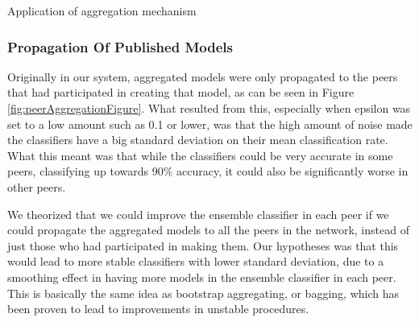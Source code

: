 \begin{algorithm}[!h]
\caption{Application of aggregation mechanism}
\end{algorithm}




\subsubsection{Propagation Of Published Models} \label{sec:PropagationPubModel}

Originally in our system, aggregated models were only propagated to the peers that had participated in creating that model, as can be seen in Figure \ref{fig:peerAggregationFigure}. What resulted from this, especially when epsilon was set to a low amount such as 0.1 or lower, was that the high amount of noise made the classifiers have a big standard deviation on their mean classification rate. What this meant was that while the classifiers could be very accurate in some peers, classifying up towards 90\% accuracy, it could also be significantly worse in other peers. 

We theorized that we could improve the ensemble classifier in each peer if we could propagate the aggregated models to all the peers in the network, instead of just those who had participated in making them. Our hypotheses was that this would lead to more stable classifiers with lower standard deviation, due to a smoothing effect in having more models in the ensemble classifier in each peer. This is basically the same idea as bootstrap aggregating, or bagging, which has been proven to lead to improvements in unstable procedures\citep{breiman1996bagging}. 

